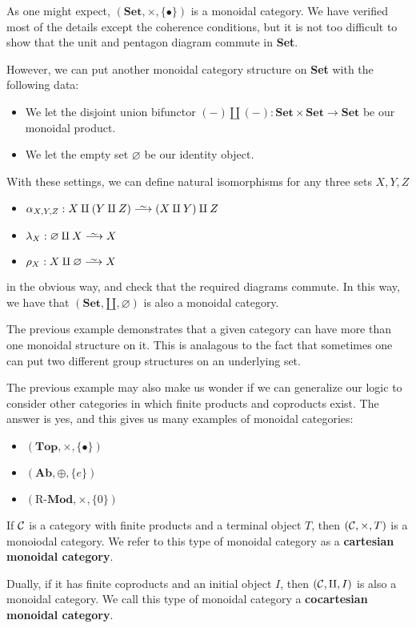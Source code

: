\begin{example}
    As one might expect, $(\textbf{Set}, \times, \{\bullet\})$
    is a monoidal category. We have verified most of the details except the coherence 
    conditions, but it is not too difficult to show that the unit and pentagon diagram 
    commute in \textbf{Set}.

    However, we can put another monoidal category structure on \textbf{Set} with the 
    following data:
    \begin{itemize}
        \item We let the disjoint union bifunctor $(-)\coprod (-): \textbf{Set}\times \textbf{Set} \to \textbf{Set}$
        be our monoidal product. 
        \item We let the empty set $\varnothing$ be our identity object.
    \end{itemize}
    With these settings, we can define natural isomorphisms for any three sets $X, Y, Z$ 
    \begin{itemize}
        \item $\alpha_{X, Y, Z}: X \amalg (Y \amalg Z) \isomarrow (X \amalg Y) \amalg Z$ 
        \item $\lambda_X: \varnothing \amalg X \isomarrow X$
        \item $\rho_X: X \amalg \varnothing \isomarrow X$
    \end{itemize}
    in the obvious way, and check that the required diagrams commute. In this way, we have that 
    $(\textbf{Set}, \amalg, \varnothing)$ is also a monoidal category. 
\end{example}

The previous example demonstrates that a given category can have more than one 
monoidal structure on it. This is analagous to the fact that sometimes one can put two 
different group structures on an underlying set. 

The previous example may also make us wonder if we can generalize our logic to consider 
other categories in which finite products and coproducts exist. The answer is yes, 
and this gives us many examples of monoidal categories: 
\begin{itemize}
    \item $(\textbf{Top}, \times, \{\bullet\})$
    \item $(\textbf{Ab}, \oplus, \{e\})$
    \item $(\text{R}\textbf{-Mod}, \times, \{0\})$ 
\end{itemize}

\begin{proposition}
    If $\mathcal{C}$ is a category with finite products and a terminal object $T$, then 
    $(\mathcal{C}, \times, T)$ is a monoiodal category. We refer to this type of monoidal 
    category as a \textbf{cartesian monoidal category}. 
    
    Dually, if it has finite coproducts and an initial object 
    $I$, then $(\mathcal{C}, \amalg, I)$ is also a monoidal category. We call this type of 
    monoidal category a \textbf{cocartesian monoidal category}.
\end{proposition}

